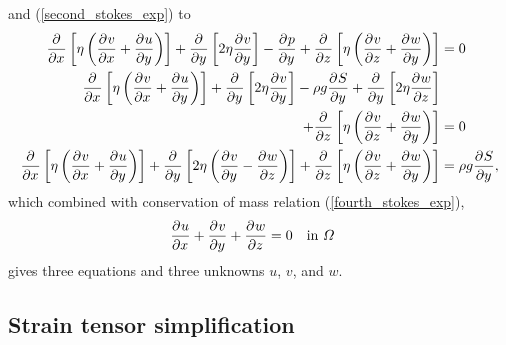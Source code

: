 and (\ref{second_stokes_exp}) to
{\tiny
\begin{align}
  \parder{}{x} \left[\eta \left( \parder{v}{x} + \parder{u}{y} \right) \right]  + \parder{}{y} \left[2\eta \parder{v}{y} \right] - \parder{p}{y} + \parder{}{z} \left[\eta \left( \parder{v}{z} + \parder{w}{y} \right) \right] &= 0 \notag \\ 
  \parder{}{x} \left[\eta \left( \parder{v}{x} + \parder{u}{y} \right) \right]  + \parder{}{y} \left[2\eta \parder{v}{y} \right] - \rho g\parder{S}{y} + \parder{}{y} \left[ 2\eta \parder{w}{z} \right] &\notag \\
  + \parder{}{z} \left[\eta \left( \parder{v}{z} + \parder{w}{y} \right) \right] &= 0 \notag \\ 
  \label{second_stokes_exp_stress_simp}
  \parder{}{x} \left[\eta \left( \parder{v}{x} + \parder{u}{y} \right) \right]  + \parder{}{y} \left[2\eta \left( \parder{v}{y} - \parder{w}{z} \right) \right] + \parder{}{z} \left[\eta \left( \parder{v}{z} + \parder{w}{y} \right) \right] &= \rho g \parder{S}{y},
\end{align}}
which combined with conservation of mass relation (\ref{fourth_stokes_exp}),
\begin{align*}
  \frac{\partial^{} u}{\partial x^{} } + \frac{\partial^{} v}{\partial y^{} } + \frac{\partial^{} w}{\partial z^{} } &= 0 && \text{in } \varOmega 
\end{align*}
gives three equations and three unknowns $u$, $v$, and $w$.

\subsection{Strain tensor simplification} \label{ssn_strain_tensor_simplification}

